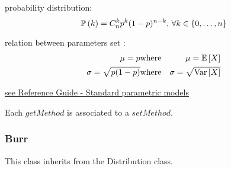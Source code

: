 \begin{description}
\begin{description}
  \end{description}

\item[Details :]  \rule{0pt}{1em}
  \begin{description}
  \item probability distribution:
    $$
    {\mathbb P}\left( k \right)  = C_n^k p^k (1-p)^{n-k}, \, \forall k \in \{0, \hdots, n\}
    $$
  \item relation between parameters set :
    \begin{eqnarray*}
      \mu  =   p                                              & \mbox{where}& \mu ={\mathbb E}\left[ X \right] \\
      \sigma  = \sqrt{p(1-p)}  & \mbox{where}& \sigma =\sqrt{{\rm Var}\left[ X \right] }
    \end{eqnarray*}

  \end{description}
  \bigskip

\item[Links :]  \rule{0pt}{1em}
  \href{OpenTURNS_ReferenceGuide.pdf}{see Reference Guide - Standard parametric models}
\end{description}


Each  $getMethod$  is associated to a $setMethod$.




\newpage \subsubsection{Burr}

This class inherits from the Distribution class.

